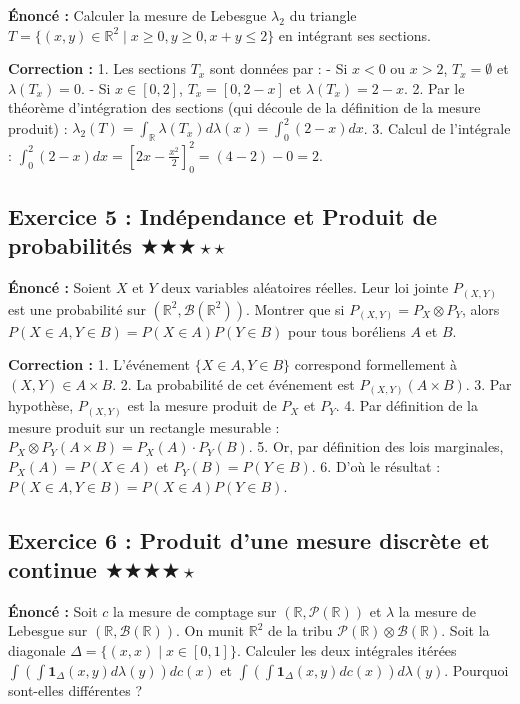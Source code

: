\documentclass[11pt,a4paper]{article}
\begin{document}
\textbf{Énoncé :}
Calculer la mesure de Lebesgue $\lambda_2$ du triangle $T = \{ (x, y) \in \mathbb{R}^2 \mid x \ge 0, y \ge 0, x+y \le 2 \}$ en intégrant ses sections.

\textbf{Correction :}
1. Les sections $T_x$ sont données par :
   - Si $x < 0$ ou $x > 2$, $T_x = \emptyset$ et $\lambda(T_x) = 0$.
   - Si $x \in [0, 2]$, $T_x = [0, 2-x]$ et $\lambda(T_x) = 2-x$.
2. Par le théorème d'intégration des sections (qui découle de la définition de la mesure produit) :
   $\lambda_2(T) = \int_{\mathbb{R}} \lambda(T_x) d\lambda(x) = \int_0^2 (2-x) dx$.
3. Calcul de l'intégrale :
   $\int_0^2 (2-x) dx = \left[ 2x - \frac{x^2}{2} \right]_0^2 = (4 - 2) - 0 = 2$.

\subsection*{Exercice 5 : Indépendance et Produit de probabilités \quad $\bigstar\bigstar\bigstar\star\star$}

\textbf{Énoncé :}
Soient $X$ et $Y$ deux variables aléatoires réelles. Leur loi jointe $P_{(X,Y)}$ est une probabilité sur $(\mathbb{R}^2, \mathcal{B}(\mathbb{R}^2))$.
Montrer que si $P_{(X,Y)} = P_X \otimes P_Y$, alors $P(X \in A, Y \in B) = P(X \in A)P(Y \in B)$ pour tous boréliens $A$ et $B$.

\textbf{Correction :}
1. L'événement $\{X \in A, Y \in B\}$ correspond formellement à $(X, Y) \in A \times B$.
2. La probabilité de cet événement est $P_{(X,Y)}(A \times B)$.
3. Par hypothèse, $P_{(X,Y)}$ est la mesure produit de $P_X$ et $P_Y$.
4. Par définition de la mesure produit sur un rectangle mesurable :
   $P_X \otimes P_Y(A \times B) = P_X(A) \cdot P_Y(B)$.
5. Or, par définition des lois marginales, $P_X(A) = P(X \in A)$ et $P_Y(B) = P(Y \in B)$.
6. D'où le résultat : $P(X \in A, Y \in B) = P(X \in A)P(Y \in B)$.

\subsection*{Exercice 6 : Produit d'une mesure discrète et continue \quad $\bigstar\bigstar\bigstar\bigstar\star$}

\textbf{Énoncé :}
Soit $c$ la mesure de comptage sur $(\mathbb{R}, \mathcal{P}(\mathbb{R}))$ et $\lambda$ la mesure de Lebesgue sur $(\mathbb{R}, \mathcal{B}(\mathbb{R}))$. On munit $\mathbb{R}^2$ de la tribu $\mathcal{P}(\mathbb{R}) \otimes \mathcal{B}(\mathbb{R})$.
Soit la diagonale $\Delta = \{(x,x) \mid x \in [0,1]\}$. Calculer les deux intégrales itérées $\int (\int \mathbf{1}_\Delta(x,y) d\lambda(y)) dc(x)$ et $\int (\int \mathbf{1}_\Delta(x,y) dc(x)) d\lambda(y)$.
Pourquoi sont-elles différentes ?
\end{document}
